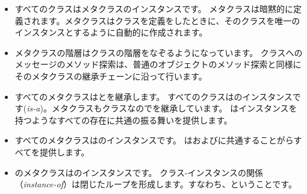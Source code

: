 \documentclass[a4paper,10pt,twoside]{book}
\begin{document}
\begin{itemize}
\item すべてのクラスはメタクラスのインスタンスです。
	メタクラスは暗黙的に定義されます。メタクラスはクラスを定義をしたときに、そのクラスを唯一のインスタンスとするように自動的に作成されます。

\item メタクラスの階層はクラスの階層をなぞるようになっています。
	クラスへのメッセージのメソッド探索は、普通のオブジェクトのメソッド探索と同様にそのメタクラスの継承チェーンに沿って行います。

\item すべてのメタクラスはとを継承します。
	すべてのクラスはのインスタンスです(\emph{is-a})。メタクラスもクラスなのでを継承しています。
	はインスタンスを持つようなすべての存在に共通の振る舞いを提供します。

\item すべてのメタクラスはのインスタンスです。
	はおよびに共通することがらすべてを提供します。

\item {}のメタクラスはのインスタンスです。
	クラス-インスタンスの関係（\emph{instance-of}）は閉じたループを形成します。すなわち、ということです。
\end{itemize}
\ifx\wholebook\relax\else
\end{document}
